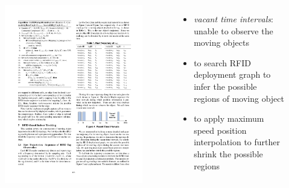 \begin{frame}
\begin{columns}[c]
    \begin{figure}[tb]
      \includegraphics[width=\columnwidth]{figures/2-1/2-1-7.pdf}
    \end{figure}

    \vspace{-15pt}
    \scriptsize{
      \begin{itemize}
        \item \emph{vacant time intervals}: unable to observe the moving objects \pause
        \item to search RFID deployment graph to infer the possible regions of moving object \pause
        \item to apply maximum speed position interpolation to further shrink the possible regions
      \end{itemize}
    }

  \end{columns}

\end{frame}

